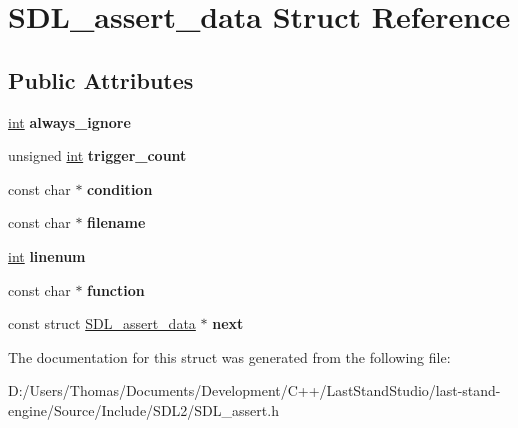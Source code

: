 \hypertarget{structSDL__assert__data}{}\section{S\+D\+L\+\_\+assert\+\_\+data Struct Reference}
\label{structSDL__assert__data}
\subsection*{Public Attributes}
\begin{DoxyCompactItemize}
\item 
\hypertarget{structSDL__assert__data_ac8997040e60dd538facd3604f0498dd4}{}\hyperlink{SDL__thread_8h_a6a64f9be4433e4de6e2f2f548cf3c08e}{int} {\bfseries always\+\_\+ignore}\label{structSDL__assert__data_ac8997040e60dd538facd3604f0498dd4}

\item 
\hypertarget{structSDL__assert__data_ac3e02d5e1ed06d11f7e49b6d652655d6}{}unsigned \hyperlink{SDL__thread_8h_a6a64f9be4433e4de6e2f2f548cf3c08e}{int} {\bfseries trigger\+\_\+count}\label{structSDL__assert__data_ac3e02d5e1ed06d11f7e49b6d652655d6}

\item 
\hypertarget{structSDL__assert__data_aa2e21779fd9c5fd035c6deabe8aa4325}{}const char $\ast$ {\bfseries condition}\label{structSDL__assert__data_aa2e21779fd9c5fd035c6deabe8aa4325}

\item 
\hypertarget{structSDL__assert__data_ac4ae13a8034710658976e462a508ed39}{}const char $\ast$ {\bfseries filename}\label{structSDL__assert__data_ac4ae13a8034710658976e462a508ed39}

\item 
\hypertarget{structSDL__assert__data_aec495b21ff71db1226eff0e6d5db333a}{}\hyperlink{SDL__thread_8h_a6a64f9be4433e4de6e2f2f548cf3c08e}{int} {\bfseries linenum}\label{structSDL__assert__data_aec495b21ff71db1226eff0e6d5db333a}

\item 
\hypertarget{structSDL__assert__data_a437899d4b1faaab73d14096374a5a18b}{}const char $\ast$ {\bfseries function}\label{structSDL__assert__data_a437899d4b1faaab73d14096374a5a18b}

\item 
\hypertarget{structSDL__assert__data_a8737ef791c8f3f1f4db4c8f627543936}{}const struct \hyperlink{structSDL__assert__data}{S\+D\+L\+\_\+assert\+\_\+data} $\ast$ {\bfseries next}\label{structSDL__assert__data_a8737ef791c8f3f1f4db4c8f627543936}

\end{DoxyCompactItemize}


The documentation for this struct was generated from the following file\+:\begin{DoxyCompactItemize}
\item 
D\+:/\+Users/\+Thomas/\+Documents/\+Development/\+C++/\+Last\+Stand\+Studio/last-\/stand-\/engine/\+Source/\+Include/\+S\+D\+L2/S\+D\+L\+\_\+assert.\+h\end{DoxyCompactItemize}
